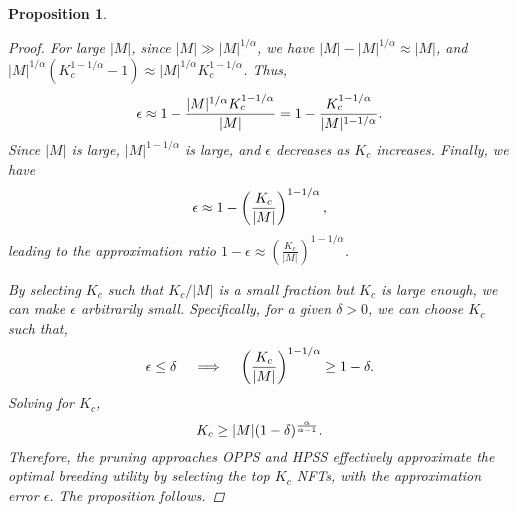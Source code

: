 \documentclass[conference]{IEEEtran}
\theoremstyle{plain}
\newtheorem{proposition}{Proposition}
\begin{document}
\begin{proposition}
{\begin{proof}
For large $|M|$, since $|M| \gg |M|^{1/\alpha}$, we have $|M| - |M|^{1/\alpha} \approx |M|$, and $ |M|^{1/\alpha} \left( K_c^{1 - 1/\alpha} - 1 \right) \approx |M|^{1/\alpha} K_c^{1 - 1/\alpha}$. Thus,
\begin{equation}\small
    \epsilon \approx 1 - \frac{|M|^{1/\alpha} K_c^{1 - 1/\alpha}}{|M|} = 1 - \frac{K_c^{1 - 1/\alpha}}{|M|^{1 - 1/\alpha}}.
\end{equation}
Since $|M|$ is large, $|M|^{1 - 1/\alpha}$ is large, and $\epsilon$ decreases as $K_c$ increases. 
Finally, we have
\begin{equation}\small
    \epsilon \approx 1 - \left( \frac{K_c}{|M|} \right)^{1 - 1/\alpha},
\end{equation}
leading to the approximation ratio $1 - \epsilon \approx \left( \frac{K_c}{|M|} \right)^{1 - 1/\alpha}$.

By selecting $K_c$ such that $K_c/|M|$ is a small fraction but $K_c$ is large enough, we can make $\epsilon$ arbitrarily small. Specifically, for a given $\delta > 0$, we can choose $K_c$ such that,
\begin{equation}\small
    \epsilon \leq \delta \quad \implies \quad \left( \frac{K_c}{|M|} \right)^{1 - 1/\alpha} \geq 1 - \delta.
\end{equation}
Solving for $K_c$,
\begin{equation}\small
    K_c \geq |M| (1 - \delta)^{\frac{\alpha}{\alpha - 1}}.
\end{equation}
Therefore, the pruning approaches OPPS\xspace and HPSS\xspace effectively approximate the optimal breeding utility by selecting the top $K_c$ NFTs, with the approximation error $\epsilon$. The proposition follows.


    \end{proof}
    }
\end{proposition}
\end{document}
